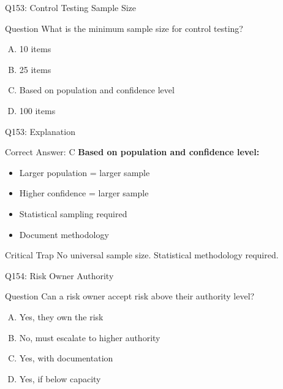 \documentclass{beamer}
\begin{document}
	\begin{frame}{Q153: Control Testing Sample Size}
		\begin{block}{Question}
			What is the minimum sample size for control testing?
		\end{block}
		\begin{enumerate}[(A)]
			\item 10 items
			\item 25 items
			\item Based on population and confidence level
			\item 100 items
		\end{enumerate}
	\end{frame}
	
	\begin{frame}{Q153: Explanation}
		\begin{block}{Correct Answer: C}
			\textbf{Based on population and confidence level:}
			\begin{itemize}
				\item Larger population = larger sample
				\item Higher confidence = larger sample
				\item Statistical sampling required
				\item Document methodology
			\end{itemize}
		\end{block}
		\begin{alertblock}{Critical Trap}
			No universal sample size.
			Statistical methodology required.
		\end{alertblock}
	\end{frame}
	
	\begin{frame}{Q154: Risk Owner Authority}
		\begin{block}{Question}
			Can a risk owner accept risk above their authority level?
		\end{block}
		\begin{enumerate}[(A)]
			\item Yes, they own the risk
			\item No, must escalate to higher authority
			\item Yes, with documentation
			\item Yes, if below capacity
		\end{enumerate}
	\end{frame}
	
\end{document}
